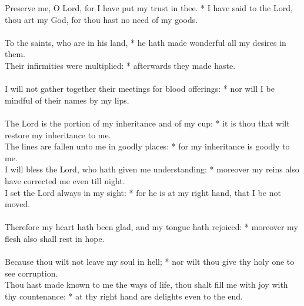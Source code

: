 \begin{Parallel}[v]{\colw}{\colx}
{}
{\vern
{\noindent
Preserve me, O Lord, for I have put my trust in thee. * I have said to the Lord, thou art my God, for thou hast no need of my goods.\\ \\
To the saints, who are in his land, * he hath made wonderful all my desires in them.\\ 
Their infirmities were multiplied: * afterwards they made haste.\\ \\
I will not gather together their meetings for blood offerings: * nor will I be mindful of their names by my lips.\\ \\
The Lord is the portion of my inheritance and of my cup: * it is thou that wilt restore my inheritance to me.\\
The lines are fallen unto me in goodly places: * for my inheritance is goodly to me.\\
I will bless the Lord, who hath given me understanding: * moreover my reins also have corrected me even till night.\\
I set the Lord always in my sight: * for he is at my right hand, that I be not moved.\\ \\
Therefore my heart hath been glad, and my tongue hath rejoiced: * moreover my flesh also shall rest in hope.\\ \\
Because thou wilt not leave my soul in hell; * nor wilt thou give thy holy one to see corruption.\\ 
Thou hast made known to me the ways of life, thou shalt fill me with joy with thy countenance: * at thy right hand are delights even to the end.}}

\end{Parallel}




